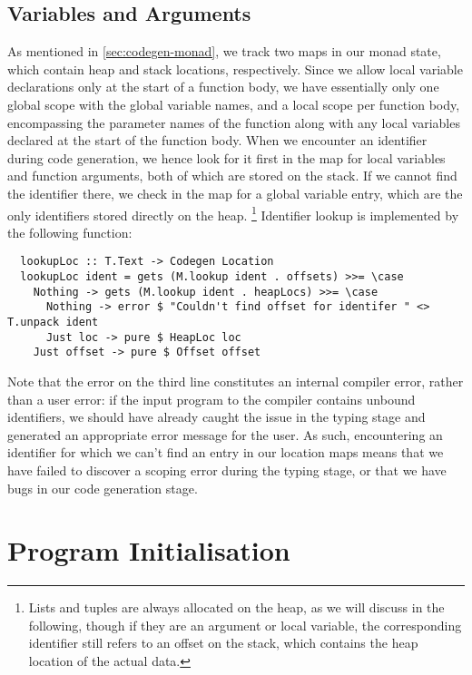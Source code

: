 \subsection{Variables and Arguments} \label{sec:codegen-vars-args}

As mentioned in \cref{sec:codegen-monad}, we track two maps in our
 monad state, which contain heap and stack locations,
respectively.
Since we allow local variable declarations only at the start of a function body,
we have essentially only one global scope with the global variable names,
and a local scope per function body, encompassing the parameter names of the
function along with any local variables declared at the start of the function
body.
When we encounter an identifier during code generation, we hence look for it
first in the  map for local variables and function arguments,
both of which are stored on the stack. If we cannot find the identifier there,
we check in the  map for a global variable entry, which are
the only identifiers stored directly on the heap.%
\footnote{Lists and tuples are always allocated on the heap, as we will discuss
in the following, though if they are an argument or local variable, the
corresponding identifier still refers to an offset on the stack, which contains
the heap location of the actual data.}
Identifier lookup is implemented by the following function:
%
\begin{verbatim}
  lookupLoc :: T.Text -> Codegen Location
  lookupLoc ident = gets (M.lookup ident . offsets) >>= \case
    Nothing -> gets (M.lookup ident . heapLocs) >>= \case
      Nothing -> error $ "Couldn't find offset for identifer " <> T.unpack ident
      Just loc -> pure $ HeapLoc loc
    Just offset -> pure $ Offset offset
\end{verbatim}
%
Note that the error on the third line constitutes an internal compiler error,
rather than a user error: if the input program to the compiler contains unbound
identifiers, we should have already caught the issue in the typing stage and
generated an appropriate error message for the user.
As such, encountering an identifier for which we can't find an entry in our
location maps means that we have failed to discover a scoping error during the
typing stage, or that we have bugs in our code generation stage.



\section{Program Initialisation} \label{sec:codegen-initialisation}


